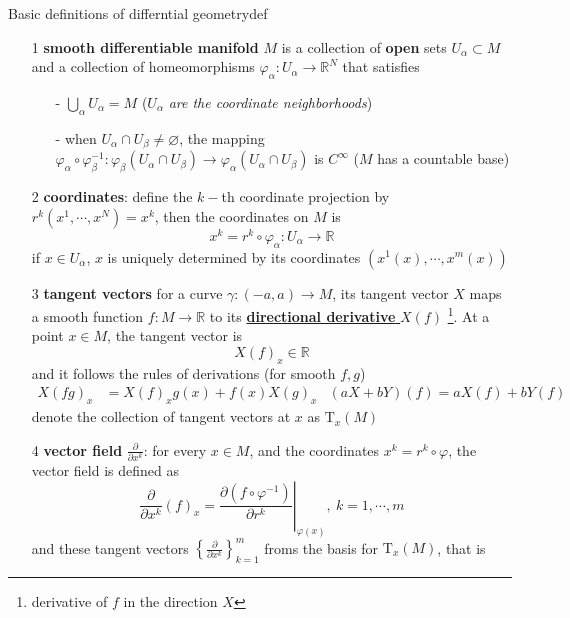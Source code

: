 \begin{definition}{Basic definitions of differntial geometry}{def}
    \begin{enumerate}
        \item[1] \textbf{smooth differentiable manifold} $M$ is a collection of \textbf{open} sets $U_{\alpha}\subset M$ and a collection of homeomorphisms $\varphi_{\alpha}:U_{\alpha}\rightarrow\mathbb{R}^N$ that satisfies
        \begin{enumerate}
            \item[-] $\bigcup_{\alpha}U_{\alpha}=M$ {(\color{red!55!black}$U_{\alpha}$\textit{ are the coordinate neighborhoods})}
            \item[-] when $U_{\alpha}\cap U_{\beta}\neq \varnothing$, the mapping $\varphi_{\alpha}\circ \varphi_{\beta}^{-1}:\varphi_{\beta}(U_{\alpha}\cap U_{\beta})\rightarrow \varphi_{\alpha}(U_{\alpha}\cap U_{\beta})$ is $C^{\infty}$ {\color{red!55!black}($M$ has a countable base)}
        \end{enumerate}
        \item[2] \textbf{coordinates}: define the $k-$th coordinate projection by $r^k\left(x^1,\cdots,x^N\right)=x^k$, then the coordinates on $M$ is 
        $$
        x^k = r^k\circ \varphi_{\alpha}: U_{\alpha}\rightarrow \mathbb{R}
        $$
        if $x\in U_{\alpha}$, $x$ is uniquely determined by its coordinates $\left(x^1(x),\cdots,x^m(x)\right)$
        \item[3] \textbf{tangent vectors} for a curve $\gamma:(-a,a)\rightarrow M$, its tangent vector $X$ maps a smooth function $f:M\rightarrow \mathbb{R}$ to its \underline{\textbf{directional derivative} $X(f)$} \footnote{derivative of $f$ in the direction $X$}. At a point $x\in M$, the tangent vector is $$ X(f)_x\in \mathbb{R} $$ and it follows the rules of derivations (for smooth $f,g$)
        \begin{align*}
            X(fg)_x&=X(f)_xg(x)+f(x)X(g)_x & (aX+bY)(f)=aX(f)+bY(f)
        \end{align*} 
        denote the collection of tangent vectors at $x$ as $\mathrm{T}_x(M)$
        \item[4] \textbf{vector field} $\frac{\partial}{\partial x^k}$: for every $x\in M$, and the coordinates $x^k = r^k\circ \varphi$, the vector field is defined as
        $$
        \frac{\partial}{\partial x^k}(f)_x = \left.\frac{\partial (f\circ \varphi^{-1})}{\partial r^k}\right\vert_{\varphi(x)},\ k=1,\cdots,m
        $$
        and these tangent vectors $\left\{\frac{\partial}{\partial x^k}\right\}_{k=1}^m$ froms the basis for $\mathrm{T}_x(M)$, that is 

\end{enumerate}
\end{definition}

